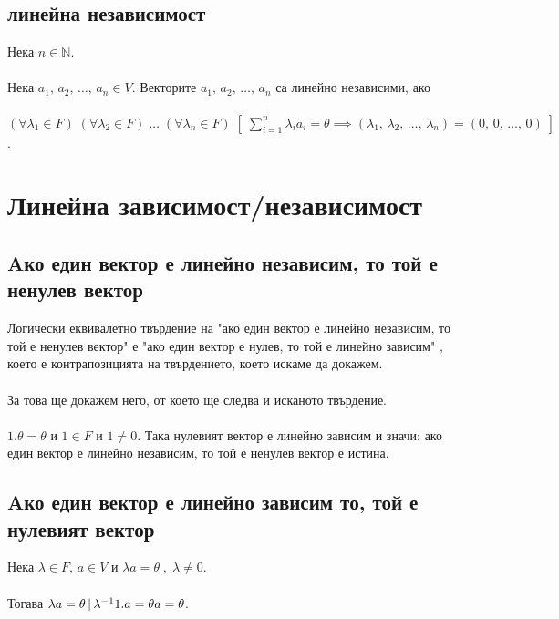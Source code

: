 \documentclass[12pt]{article}
\begin{document}
    \subsection{линейна независимост}
    Нека \(n \in \mathbb{N}\).\\\\
    Нека \(a_1, \, a_2, \, \dots, \, a_n \in V\). Векторите \(a_1, \, a_2, \, \dots, \, a_n\)  са линейно независими, ако \\\\
    \((\forall \lambda_1 \in F) \; (\forall \lambda_2 \in F) \; \dots \; (\forall \lambda_n \in F) \; \left[\; \displaystyle\sum_{i=1}^{n} \lambda_i a_i = \theta  \implies (\lambda_1, \, \lambda_2, \, \dots, \, \lambda_n) = (0, \, 0, \, \dots, \, 0) \; \right ]\).
    \section{Линейна зависимост/независимост}
    \subsection{Aко един вектор е линейно независим, то той е ненулев вектор}
    Логически еквивалетно твърдение на "ако един вектор е линейно независим,
    то той е ненулев вектор" е "ако един вектор е нулев, то той е линейно зависим" \(,\) което
    е контрапозицията на твърдението, което искаме да докажем. \\\\
    За това ще докажем него, от което ще следва и исканото твърдение. \\\\
    \(1.\theta = \theta\) и \(1 \in F\) и \(1 \neq 0\).
    Така нулевият вектор е линейно зависим и значи: ако един вектор е линейно независим, то той е ненулев вектор е истина.
    \subsection{Aко един вектор е линейно зависим то, той е нулевият вектор}
    Нека \(\lambda \in F, \, a \in V\) и \(\lambda a = \theta \; , \; \lambda \neq 0\). \\\\
    Тогава \(\lambda a = \theta \, | \, \lambda^{-1}\\\\
    1.a = \theta\\\\
    a = \theta\).
\end{document}
